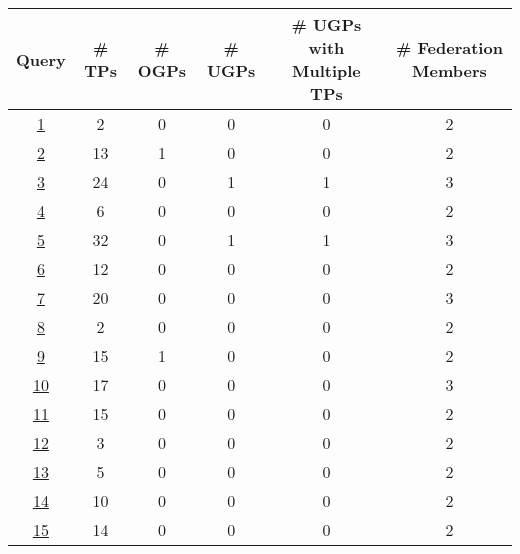 \begin{table}
	\begin{center}
		\begin{tabular}{|c|c|c|c|c|c|}
			\hline
			Query & \# TPs & \# OGPs & \# UGPs & \# UGPs with Multiple TPs & \# Federation Members \\
			\hline
			\href{https://sparql.uniprot.org/.well-known/sparql-examples/92_uniprot_bioregistry_iri_translation}{1} & 2 & 0 & 0 & 0 & 2 \\
			\hline
			\href{https://sparql.uniprot.org/.well-known/sparql-examples/51}{2} & 13 & 1 & 0 & 0 & 2 \\
			\hline
			\href{https://sparql.uniprot.org/.well-known/sparql-examples/45}{3} & 24 & 0 & 1 & 1 & 3 \\
			\hline
			\href{https://sparql.uniprot.org/.well-known/sparql-examples/46}{4} & 6 & 0 & 0 & 0 & 2 \\
			\hline
			\href{https://sparql.uniprot.org/.well-known/sparql-examples/52}{5} & 32 & 0 & 1 & 1 & 3 \\
			\hline
			\href{https://sparql.uniprot.org/.well-known/sparql-examples/40}{6} & 12 & 0 & 0 & 0 & 2 \\
			\hline
			\href{https://sparql.uniprot.org/.well-known/sparql-examples/53}{7} & 20 & 0 & 0 & 0 & 3 \\
			\hline
			\href{https://sparql.uniprot.org/.well-known/sparql-examples/99_uniprot_identifiers_org_translation}{8} & 2 & 0 & 0 & 0 & 2 \\
			\hline
			\href{https://sparql.uniprot.org/.well-known/sparql-examples/36}{9} & 15 & 1 & 0 & 0 & 2 \\
			\hline
			\href{https://sparql.uniprot.org/.well-known/sparql-examples/50}{10} & 17 & 0 & 0 & 0 & 3 \\
			\hline
			\href{https://sparql.uniprot.org/.well-known/sparql-examples/54}{11} & 15 & 0 & 0 & 0 & 2 \\
			\hline
			\href{https://sparql.uniprot.org/.well-known/sparql-examples/42}{12} & 3 & 0 & 0 & 0 & 2 \\
			\hline
			\href{https://sparql.uniprot.org/.well-known/sparql-examples/43}{13} & 5 & 0 & 0 & 0 & 2 \\
			\hline
			\href{https://sparql.uniprot.org/.well-known/sparql-examples/70_enzymes_interacting_with_molecules_similar_to_dopamine}{14} & 10 & 0 & 0 & 0 & 2 \\
			\hline
			\href{https://sparql.uniprot.org/.well-known/sparql-examples/38}{15} & 14 & 0 & 0 & 0 & 2 \\

\end{tabular}
\end{center}
\end{table}
